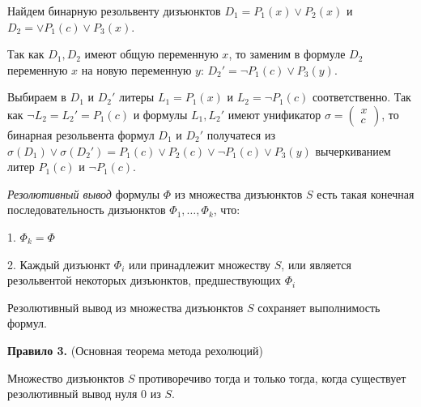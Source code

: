 \begin{example}
    Найдем бинарную резольвенту дизъюнктов $D_1=P_1(x)\lor P_2(x)$ и $D_2=\lor P_1(c)\lor P_3(x)$.

    Так как $D_1,D_2$ имеют общую переменную $x$, то заменим в формуле $D_2$ переменную $x$ на новую переменную $y$: $D_2'=\lnot P_1(c)\lor P_3(y)$.

    Выбираем в $D_1$ и $D_2'$ литеры $L_1=P_1(x)$ и $L_2=\lnot P_1(c)$ соответственно. Так как $\lnot L_2=L_2'=P_1(c)$ и формулы $L_1,L_2'$ имеют унификатор $\sigma = \begin{pmatrix} x \\ c \end{pmatrix}$, то бинарная резольвента формул $D_1$ и $D_2'$ получатеся из $\sigma(D_1)\lor\sigma(D_2')=P_1(c)\lor P_2(c)\lor\lnot P_1(c)\lor P_3(y)$ вычеркиванием литер $P_1(c)$ и $\lnot P_1(c)$.
\end{example}

\begin{definition}
    \textit{Резолютивный вывод} формулы $\Phi$ из множества дизъюнктов $S$ есть такая конечная последовательность дизъюнктов  $\Phi_1,\ldots,\Phi_k$, что:

    1. $\Phi_k=\Phi$

    2. Каждый дизъюнкт $\Phi_i$ или принадлежит множеству $S$, или является резольвентой некоторых дизъюнктов, предшествующих $\Phi_i$
\end{definition}

\begin{lemma}
    Резолютивный вывод из множества дизъюнктов $S$ сохраняет выполнимость формул.
\end{lemma}

\textbf{Правило 3.} (Основная теорема метода рехолюций)

Множество дизъюнктов $S$ противоречиво тогда и только тогда, когда существует резолютивный вывод нуля 0 из $S$.

